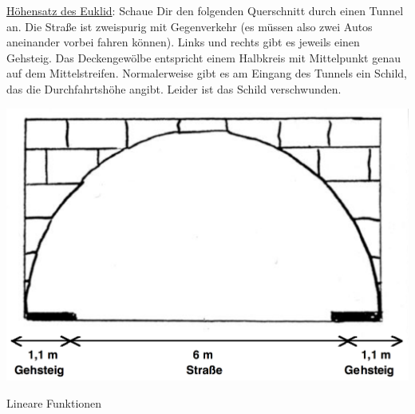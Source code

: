 \documentclass[a4paper,ngerman,12pt]{exam}
\begin{document}
\begin{questions}

\question \underline{Höhensatz des Euklid}: Schaue Dir den folgenden Querschnitt durch einen Tunnel an. Die Straße ist zweispurig mit Gegenverkehr (es müssen also zwei Autos aneinander vorbei fahren können). Links und rechts gibt es jeweils einen Gehsteig. Das Deckengewölbe entspricht einem Halbkreis mit Mittelpunkt genau auf dem Mittelstreifen. Normalerweise gibt es am Eingang des Tunnels ein Schild, das die Durchfahrtshöhe angibt. Leider ist das Schild verschwunden.\par
\begin{center}\includegraphics[width=.6\textwidth]{tunnel.png}\end{center}
\par

\pagebreak

\question Lineare Funktionen\par%
\begin{center}
\end{center}


\end{questions}
\end{document}
